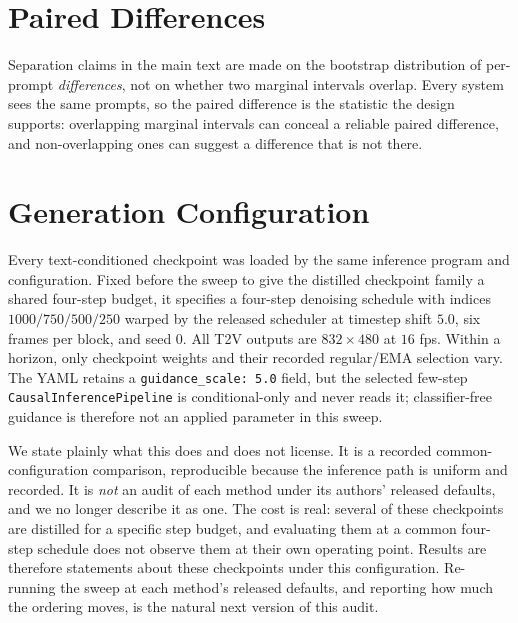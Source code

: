 \documentclass[10pt,twocolumn,letterpaper]{article}
\begin{document}


\section{Paired Differences}
\label{sup:paired}

Separation claims in the main text are made on the bootstrap distribution of
per-prompt \emph{differences}, not on whether two marginal intervals overlap.
Every system sees the same prompts, so the paired difference is the statistic
the design supports: overlapping marginal intervals can conceal a reliable
paired difference, and non-overlapping ones can suggest a difference that is
not there.



\section{Generation Configuration}
\label{sup:config}

Every text-conditioned checkpoint was loaded by the same inference program and
configuration. Fixed before the sweep to give the distilled checkpoint family
a shared four-step budget, it specifies a four-step denoising schedule with
indices $1000/750/500/250$ warped by the released scheduler at timestep shift $5.0$, six frames per
block, and seed $0$. All T2V outputs are $832\!\times\!480$ at $16$ fps. Within
a horizon, only checkpoint weights and their recorded regular/EMA selection
vary. The YAML retains a \texttt{guidance\_scale: 5.0} field, but the selected
few-step \texttt{CausalInferencePipeline} is conditional-only and never reads
it; classifier-free guidance is therefore not an applied parameter in this
sweep.

We state plainly what this does and does not license. It is a recorded
common-configuration comparison, reproducible because the inference path is
uniform and recorded. It is \emph{not} an audit of each method under its authors' released
defaults, and we no longer describe it as one. The cost is real: several of
these checkpoints are distilled for a specific step budget, and evaluating them
at a common four-step schedule does not observe them at their own operating
point. Results are therefore statements about these checkpoints under this
configuration. Re-running the sweep at each method's released defaults, and
reporting how much the ordering moves, is the natural next version of this
audit.


\end{document}
